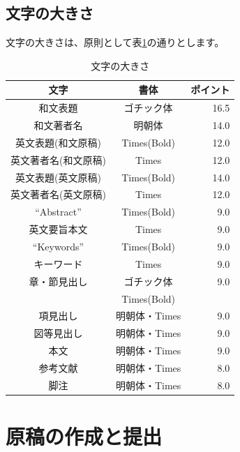 \documentclass{hissymp}
\begin{document}
\subsection{文字の大きさ}
文字の大きさは、原則として表\ref{table:charsize}の通りとします。

\begin{table}[tbh]
	\begin{center}
	\caption{文字の大きさ}		%
	\label{table:charsize}
	\begin{tabular}[hbt]{c c r}
	\hline
	\bf 文字 & \bf 書体 & \bf ポイント\\
	\hline
	和文表題 & ゴチック体 & 16.5\\
	和文著者名 & 明朝体 & 14.0\\
	英文表題(和文原稿) & Times(Bold) & 12.0\\
	英文著者名(和文原稿) & Times & 12.0\\
	英文表題(英文原稿) & Times(Bold) & 14.0\\
	英文著者名(英文原稿) & Times & 12.0\\
	``Abstract'' & Times(Bold) & 9.0\\
	英文要旨本文 & Times & 9.0\\
	``Keywords'' & Times(Bold) & 9.0 \\
	キーワード & Times & 9.0\\ \vspace{-0.7mm}
	章・節見出し & ゴチック体 & 9.0\\
	& Times(Bold) & \\
	項見出し & 明朝体・Times & 9.0\\
	図等見出し & 明朝体・Times & 9.0\\
	本文 & 明朝体・Times & 9.0\\
	参考文献 & 明朝体・Times & 8.0\\ \vspace{-0.7mm}
	脚注 & 明朝体・Times &  8.0\\
	\hline
	\end{tabular}
	\end{center}
\end{table}



\section{原稿の作成と提出}
\end{document}
